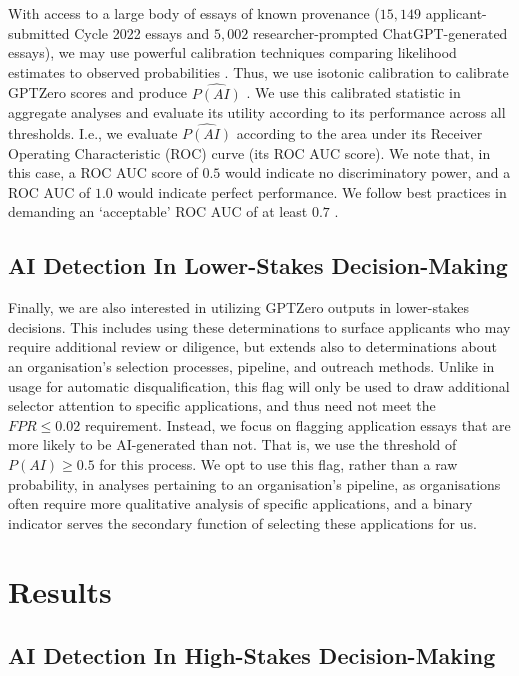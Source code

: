 With access to a large body of essays of known provenance ($15,149$ applicant-submitted Cycle 2022 essays and $5,002$ researcher-prompted ChatGPT-generated essays), we may use powerful calibration techniques comparing likelihood estimates to observed probabilities \cite{zadrozny_transforming_2002,niculescu-mizil_predicting_2005}. Thus, we use isotonic calibration to calibrate GPTZero scores and produce $\widehat{P(AI)}$ \cite{zadrozny_transforming_2002}. We use this calibrated statistic in aggregate analyses and evaluate its utility according to its performance across all thresholds. I.e., we evaluate $\widehat{P(AI)}$ according to the area under its Receiver Operating Characteristic (ROC) curve (its ROC AUC score). We note that, in this case, a ROC AUC score of $0.5$ would indicate no discriminatory power, and a ROC AUC of $1.0$ would indicate perfect performance. We follow best practices in demanding an `acceptable' ROC AUC of at least $0.7$ \cite{mandrekar_receiver_2010}.

\subsection{AI Detection In Lower-Stakes Decision-Making}
Finally, we are also interested in utilizing GPTZero outputs in lower-stakes decisions. This includes using these determinations to surface applicants who may require additional review or diligence, but extends also to determinations about an organisation's selection processes, pipeline, and outreach methods. Unlike in usage for automatic disqualification, this flag will only be used to draw additional selector attention to specific applications, and thus need not meet the $FPR \leq 0.02$ requirement. Instead, we focus on flagging application essays that are more likely to be AI-generated than not. That is, we use the threshold of $P(AI) \geq 0.5$ for this process. We opt to use this flag, rather than a raw probability, in analyses pertaining to an organisation's pipeline, as organisations often require more qualitative analysis of specific applications, and a binary indicator serves the secondary function of selecting these applications for us.

\section{Results}
\subsection{AI Detection In High-Stakes Decision-Making}\label{ssec:res_accuracy}
